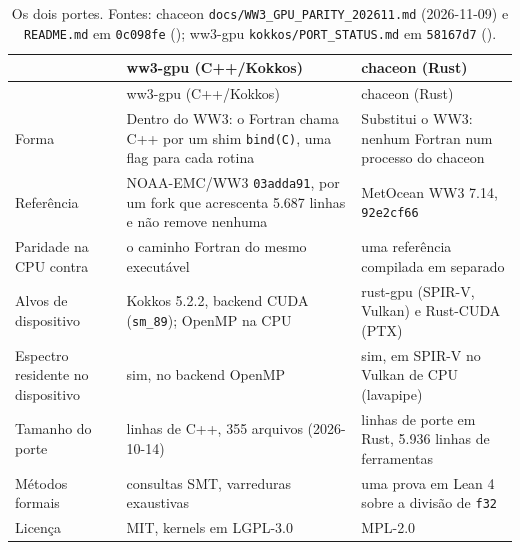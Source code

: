 \documentclass[10pt,a4paper,]{article}
\begin{document}
\begin{longtable}[]{@{}
  >{\raggedright\arraybackslash}p{}
  >{\raggedright\arraybackslash}p{}
  >{\raggedright\arraybackslash}p{}@{}}
\caption{\label{tbl:shapes}Os dois portes. Fontes: chaceon
\texttt{docs/WW3\_GPU\_PARITY\_202611.md} (2026-11-09) e
\texttt{README.md} em \texttt{0c098fe} (); ww3-gpu \texttt{kokkos/PORT\_STATUS.md} em \texttt{58167d7}
().}\tabularnewline
\toprule\noalign{}
\begin{minipage}[b]{\linewidth}\raggedright
\end{minipage} & \begin{minipage}[b]{\linewidth}\raggedright
ww3-gpu (C++/Kokkos)
\end{minipage} & \begin{minipage}[b]{\linewidth}\raggedright
chaceon (Rust)
\end{minipage} \\
\midrule\noalign{}
\endfirsthead
\toprule\noalign{}
\begin{minipage}[b]{\linewidth}\raggedright
\end{minipage} & \begin{minipage}[b]{\linewidth}\raggedright
ww3-gpu (C++/Kokkos)
\end{minipage} & \begin{minipage}[b]{\linewidth}\raggedright
chaceon (Rust)
\end{minipage} \\
\midrule\noalign{}
\endhead
\bottomrule\noalign{}
\endlastfoot
Forma & Dentro do WW3: o Fortran chama C++ por um shim \texttt{bind(C)},
uma flag para cada rotina & Substitui o WW3: nenhum Fortran num processo
do chaceon \\
Referência & NOAA-EMC/WW3 \texttt{03adda91}, por um fork que acrescenta
5.687 linhas e não remove nenhuma & MetOcean WW3 7.14,
\texttt{92e2cf66} \\
Paridade na CPU contra & o caminho Fortran do mesmo executável & uma
referência compilada em separado \\
Alvos de dispositivo & Kokkos 5.2.2, backend CUDA (\texttt{sm\_89});
OpenMP na CPU & rust-gpu (SPIR-V, Vulkan) e Rust-CUDA (PTX) \\
Espectro residente no dispositivo & sim, no backend OpenMP & sim, em
SPIR-V no Vulkan de CPU (lavapipe) \\
Tamanho do porte & 62.257 linhas de C++, 355 arquivos (2026-10-14) &
29.229 linhas de porte em Rust, 5.936 linhas de ferramentas \\
Métodos formais & consultas SMT, varreduras exaustivas & uma prova em
Lean 4 sobre a divisão de \texttt{f32} \\
Licença & MIT, kernels em LGPL-3.0 & MPL-2.0 \\
\end{longtable}
\end{document}
